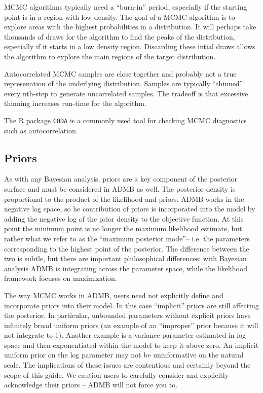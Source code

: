 \documentclass{article}\usepackage[]{graphicx}\usepackage[]{color}
\begin{document}
MCMC algorithms typically need a ``burn-in'' period,
especially if the starting point is in a region with low
density. The goal of a MCMC algorithm is to explore areas
with the highest probabilities in a distribution. It will
perhaps take thousands of draws for the algorithm to find
the peaks of the distribution, especially if it starts in a
low density region. Discarding these intial draws allows the
algorithm to explore the main regions of the target
distribution.

Autocorrelated MCMC samples are close together and probably
not a true represenation of the underlying
distribution. Samples are typically ``thinned'' every
nth-step to generate uncorrelated samples. The tradeoff is
that excessive thinning increases run-time for the
algorithm.

The R package \texttt{CODA} is a commonly used tool for
checking MCMC diagnostics such as autocorrelation.

\subsection{Priors}
As with any Bayesian analysis, priors are a key component of
the posterior surface and must be considered in ADMB as
well. The posterior density is proportional to the product
of the likelihood and priors. ADMB works in the negative log
space, so he contribution of priors is incorporated into the
model by adding the negative log of the prior density to the
objective function. At this point the minimum point is no
longer the maximum likelihood estimate, but rather what we
refer to as the ``maximum posterior mode''-- i.e. the
parameters corresponding to the highest point of the
posterior. The difference between the two is subtle, but
there are important philosophical differences: with Bayesian
analysis ADMB is integrating across the parameter space,
while the likelihood framework focuses on maximization.

The way MCMC works in ADMB, users need not explicitly define
and incorporate priors into their model. In this case
``implicit'' priors are still affecting the posterior. In
particular, unbounded parameters without explicit priors
have infinitely broad uniform priors (an example of an
``improper'' prior because it will not integrate to
1). Another example is a variance parameter estimated in log
space and then exponentiated within the model to keep it
above zero. An implicit uniform prior on the log parameter
may not be uninformative on the natural scale. The
implications of these issues are contentious and certainly
beyond the scope of this guide. We caution users to
carefully consider and explicitly acknowledge their priors
-- ADMB will not force you to.
\end{document}
